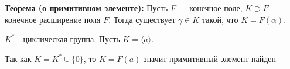 \par \textbf{Теорема (о примитивном элементе):} Пусть $F$ — конечное поле, $K \supset F$ — конечное расширение поля $F$. Тогда существует $\gamma \in K$ такой, что $K=F(\alpha)$.
\par \Proof $K^*$ - циклическая группа. Пусть $K=\langle a \rangle$.
\par Так как $K=K^* \cup \{0\}$, то $K=F(a)$ значит примитивный элемент найден \EndProof